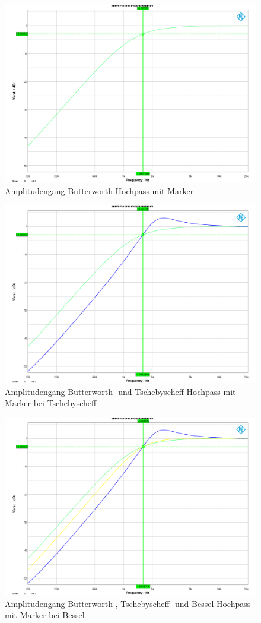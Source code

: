 \begin{figure}[h]
\centering
\includegraphics[width=0.65\linewidth]{Bilder/ImLabor/Amplitudengang_1_1_Butter_HP}
\caption{Amplitudengang Butterworth-Hochpass mit Marker}
\label{fig:Amplitudengang_1_1_Butter_HP}
\end{figure}

\begin{figure}[h]
\centering
\includegraphics[width=0.65\linewidth]{Bilder/ImLabor/Amplitudengang_1_2_Tscheby_HP}
\caption{Amplitudengang Butterworth- und Tschebyscheff-Hochpass mit Marker bei Tschebyscheff}
\label{fig:Amplitudengang_1_2_Tscheby_HP}
\end{figure}

\begin{figure}[h]
\centering
\includegraphics[width=0.65\linewidth]{Bilder/ImLabor/Amplitudengang_1_3_Bessel_HP_Alle}
\caption{Amplitudengang Butterworth-, Tschebyscheff- und Bessel-Hochpass mit Marker bei Bessel}
\label{fig:Amplitudengang_1_3_Bessel_HP_Alle}
\end{figure}

